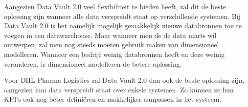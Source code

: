 Aangezien Data Vault 2.0 veel flexibiliteit te bieden heeft, zal dit de beste oplossing zijn wanneer alle data verspreidt staat op verschillende systemen. Bij Data Vault 2.0 is het namelijk mogelijk gemakkelijk nieuwe databronnen toe te voegen in een datawarehouse. Maar wanneer men de de data marts wil ontwerpen, zal men nog steeds moeten gebruik maken van dimensioneel modelleren. Wanneer een bedrijf weinig databronnen heeft en deze weinig veranderen, is dimensioneel modelleren de betere oplossing. 

Voor DHL Pharma Logistics zal Data Vault 2.0 dan ook de beste oplossing zijn, aangezien hun data verspreidt staat over enkele systemen. Zo kunnen ze hun KPI's ook nog beter definiëren en makkelijker aanpassen in het systeem. 
